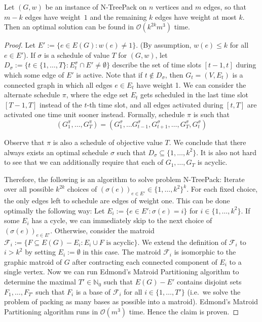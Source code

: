 \documentclass[runningheads]{llncs}
\newcommand{\N}{\mathbb{N}}
\newcommand{\set}[1]{\{ #1 \}}
\newcommand{\fromto}[2]{\set{#1, \ldots, #2}}
\newcommand{\bigO}{\mathcal{O}}
\newcommand{\xxxNTP}{{\sc N-TreePack}}
\begin{document}
\begin{theorem}
Let $(G,w)$ be an instance of {\xxxNTP} on $n$ vertices and $m$ edges, so that $m-k$ edges have weight~$1$ and the remaining $k$ edges have weight at most $k$. 
Then an optimal solution can be found in $\bigO(k^{2k}m^3)$ time.
\end{theorem}

\begin{proof}
Let $E' := \set{e \in E(G) : w(e) \neq 1}$. (By assumption, $w(e) \leq k$ for all $e \in E'$). If $\sigma$ is a schedule of value $T$ for $(G, w)$,  let $D_\sigma := \set{t \in \fromto{1}{T} : E_t^\sigma \cap E' \neq \emptyset}$ describe the set of time slots $[t-1, t]$ during which some edge of $E'$ is active. Note that  if $t \not\in D_\sigma$, then $G_t = (V, E_t)$ is a connected graph in which all edges $e \in E_t$ have weight 1. We can consider the alternate schedule $\pi$, where the edge set $E_t$ gets scheduled in the last time slot $[T-1, T]$ instead of the $t$-th time slot, and all edges activated during $[t, T]$ are activated one time unit sooner instead. Formally, schedule $\pi$ is such that
\[(G^\pi_1,\dots, G^\pi_T) = (G^\sigma_1, \dots G^\sigma_{t-1}, G^\sigma_{t+1}, \dots, G^\sigma_T, G^\sigma_t) \]

Observe that $\pi$ is also a schedule of objective value $T$. We conclude that there always exists an optimal schedule $\sigma$ such that $D_\sigma \subseteq \fromto{1}{k^2}$. It is also not  hard to see that we can additionally require that each of $G_1, \dots, G_T$ is acyclic.

Therefore, the following is an algorithm to solve problem {\xxxNTP}: Iterate over all possible $k^{2k}$ choices of $(\sigma(e))_{e \in E'} \in \fromto{1}{k^2}^k$. For each fixed choice, the only edges left to schedule are edges of weight one. This can be done optimally the following way: Let $E_i := \set{e \in E' : \sigma(e) = i}$ for $i \in \fromto{1}{k^2}$. If some $E_i$ has a cycle, we can immediately skip to the next choice of $(\sigma(e))_{e \in E'}$. Otherwise, consider the matroid $\mathcal{F}_i := \set{F \subseteq E(G)-E_i : E_i \cup F \text{ is acyclic}}$. We extend the definition of $\mathcal{F}_i$ to $i > k^2$ by setting $E_i := \emptyset$ in this case. The matroid $\mathcal{F}_i$ is isomorphic to the graphic matroid of $G$ after contracting each connected component of $E_i$ to a single vertex. Now we can run
 Edmond's Matroid Partitioning algorithm \cite{edmonds1965minimum} to determine the maximal $T' \in \N_0$ such that $E(G)-E'$ contains disjoint sets $F_1, \dots, F_{T'}$ such that $F_i$ is a base of $\mathcal{F}_i$ for all $i \in \fromto{1}{T'}$ (i.e.\ we solve the problem of packing as many bases as possible into a matroid). Edmond's Matroid Partitioning algorithm runs in $\bigO(
m^3)$ time. Hence the claim is proven.
\end{proof}
\end{document}
